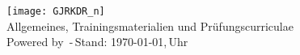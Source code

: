 	\begin{center}
		\texttt{[image: GJRKDR\_n]}\\
		Allgemeines, Trainingsmaterialien und Prüfungscurriculae\\{\scriptsize \textsf{Powered by} \LaTeXe \textsf{\,-\,Stand: \today,\,\currenttime Uhr}} 
	\end{center}